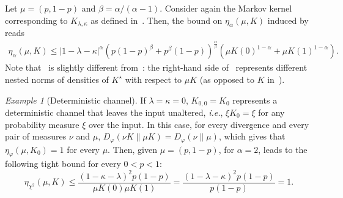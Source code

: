 \documentclass[11pt]{article}
\theoremstyle{plain}
\theoremstyle{remark}
\newtheorem{example}{Example}
\begin{document}
Let $\mu=(p,1-p)$ and $\beta=\alpha/(\alpha-1)$. Consider again the Markov kernel corresponding to $K_{\lambda, \kappa}$ as defined in~. %
    Then, the bound on $\eta_\alpha(\mu, K)$ induced by~ reads
    \begin{align}
        \eta_\alpha(\mu, K) \leq |1-\lambda-\kappa|^\alpha(p(1-p)^\beta+p^\beta(1-p))^\frac{\alpha}{\beta}(\mu K(0)^{1-\alpha}+\mu K(1)^{1-\alpha}).\label{eq:upperBoundGenAlphaMuBSC}
    \end{align}
    Note that~ is slightly different from~: the right-hand side of~ represents different nested norms of densities of $K^\star$ with respect to $\mu K$ (as opposed to $K$ in~).
   \begin{example}[Deterministic channel]
         If $\lambda = \kappa = 0$, $K_{0,0}=K_0$ represents a deterministic channel that leaves the input unaltered, \textit{i.e.}, %
         $\xi K_0 = \xi$ for any probability measure $\xi$ over the input. In this case, for every divergence and every pair of measures $\nu$ and $\mu$, $D_\varphi(\nu K\| \mu K) = D_\varphi(\nu\|\mu)$, which gives that $\eta_\varphi(\mu,K_0) = 1$ for every $\mu$. %
         Then, given $\mu=(p,1-p)$, for $\alpha=2$,  leads to the following tight bound for every $0<p<1$:
    \begin{equation}
        \eta_{\chi^2}(\mu,K) \leq \frac{(1-\kappa-\lambda)^2 p(1-p)}{\mu K(0)\mu K(1)} = \frac{(1-\lambda-\kappa)^2 p(1-p)}{p(1-p)} = 1.
    \end{equation}
    \end{example}
 
\end{document}
